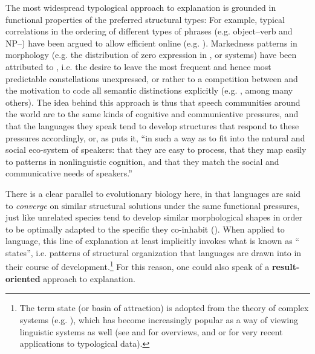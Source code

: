 \documentclass[output=paper]{langsci/langscibook}
\begin{document}
The most widespread typological approach to explanation is grounded in functional properties of the preferred structural types: For example, typical correlations in the ordering of different types of phrases (e.g. object–verb and NP–) have been argued to allow efficient online  (e.g. \citealt{Hawkins1994_Perf,Hawkins2004_Eff}). Markedness patterns in morphology (e.g. the distribution of zero expression in ,  or  systems) have been attributed to , i.e. the desire to leave the most frequent and hence most predictable constellations unexpressed, or rather to a competition between  and the motivation to code all semantic distinctions explicitly (e.g. \citealt{Haiman1983,Comrie1989,Aissen2003,Croft2003,Haspelmath2008_Econ}, among many others). The  idea behind this approach is thus that speech communities around the world are  to the same kinds of cognitive and communicative pressures, and that the languages they speak tend to develop structures that respond to these pressures accordingly, or, as \citet[118]{Bickel2014} puts it, “in such a way as to fit into the natural and social eco-system of speakers: that they are easy to process, that they map easily to patterns in nonlinguistic cognition, and that they match the social and communicative needs of speakers.” 

There is a clear parallel to evolutionary biology here, in that languages are said to \textit{converge} on similar structural solutions under the same functional pressures, just like unrelated species tend to develop similar morphological shapes in order to be optimally adapted to the specific  they co-inhabit (\citealt{Deacon1997,Caldwell2008,EvansLevinson2009,Givón2010}). When applied to language, this line of explanation at least implicitly invokes what is known as “ states”, i.e. patterns of structural organization that languages are drawn into in their course of development.\footnote{The term  state (or basin of attraction) is adopted from the theory of complex  systems (e.g.  \citealt{Cooper1999,HoweLewis2005,Holland2006}), which has become increasingly popular as a way of viewing linguistic systems as well (see \citealt{BecknerEtAl2009} and \citealt{Port2009} for  overviews, and \citealt{Haig2018} or \citealt{Nichols2018} for very recent applications to typological data).} For this reason, one could also speak of a \textbf{result-oriented} approach to explanation. 
\end{document}
